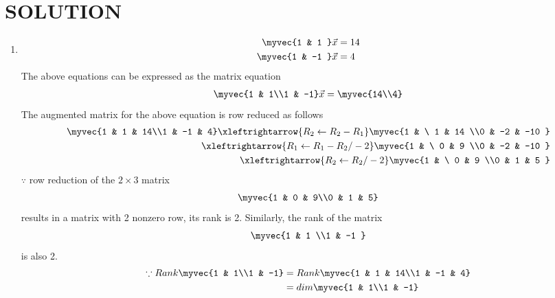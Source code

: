 \documentclass[journal,12pt,twocolumn]{IEEEtran}
\begin{document}
\section{SOLUTION}  
\begin{enumerate}
\item
\begin{align}
\begin{split}
\myvec{1 & 1 }\vec{x}&=14
\\
\myvec{1 & -1 }\vec{x}&=4
\end{split}
\end{align}
The above equations can be expressed as the matrix equation
\begin{align}
\myvec{1 & 1\\1 & -1} \vec{x} = \myvec{14\\4}
\end{align}
%
The augmented matrix for the above equation is row reduced as follows
\begin{align}
\myvec{1 & 1 & 14\\1 & -1 & 4} 
\xleftrightarrow {R_2\leftarrow R_2 -R_1}\myvec{1 & \ 1 & 14 \\0 & -2 & -10 }
\\
\xleftrightarrow {R_1\leftarrow R_1 -R_2/-2}\myvec{1 & \ 0 & 9 \\0 & -2 & -10 }
\\
\xleftrightarrow {R_2\leftarrow R_2/-2}\myvec{1 & \ 0 & 9 \\0 & 1 & 5 }
\end{align}
%
$\because$ row reduction of the $2\times 3$ matrix
%
\begin{align}
\myvec{1 & 0 & 9\\0 & 1 & 5} 
\end{align}
%
results in a matrix with 2 nonzero row, its rank is 2. 
%
Similarly, the rank of the matrix 
\begin{align}
\myvec{1 & 1 \\1 & -1 } 
\end{align}
%
is also 2.
%
\begin{align}
\because Rank \myvec{1 & 1\\1 & -1} &= Rank\myvec{1 & 1 & 14\\1 & -1 & 4} \nonumber\\
 &=dim \myvec{1 & 1\\1 & -1}\nonumber\\

\end{align}
\end{enumerate}
\end{document}
